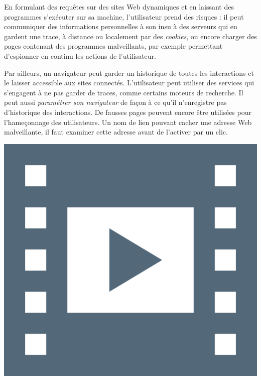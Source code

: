 \begin{tcolorbox}[title={Sécurité et confidentialité}, toprule=0pt, leftrule=0pt, rightrule=0pt, arc=0pt,
                  fonttitle=\scshape\boxtitlefont,
                  colbacktitle=white, coltitle=firstcolor, colframe=firstcolor, colback=firstcolor!10,
                  breakable, enhanced jigsaw]
En formulant des requêtes sur des sites Web dynamiques et en laissant des programmes s’exécuter sur sa machine, l’utilisateur prend des risques : il peut communiquer des informations personnelles à son insu à des serveurs qui en gardent une trace, à distance ou localement par des \textit{cookies}, ou encore charger des pages contenant des programmes malveillants, par exemple permettant d’espionner en continu les actions de l’utilisateur. 

Par ailleurs, un navigateur peut garder un historique de toutes les interactions et le laisser accessible aux sites connectés. L’utilisateur peut utiliser des services qui s’engagent à ne pas garder de traces, comme certains moteurs de recherche. Il peut aussi \emph{paramétrer son navigateur} de façon à ce qu'il n’enregistre pas d’historique des interactions. De fausses pages peuvent encore être utilisées pour l’hameçonnage des utilisateurs. Un nom de lien pouvant cacher une adresse Web malveillante, il faut examiner cette adresse avant de l’activer par un clic.
\end{tcolorbox}


\begin{marginvideo}
	[\label{vid:IX.6}Web et information, Julien \textsc{Pierre}.]%
	\href{https://www.youtube.com/watch?v=eRtSRmcKQ1s}%
	  {\includegraphics[width=\marginparwidth]{./Images/Pictograms/film-strip-dark-electric-blue.png}}%
\end{marginvideo}

